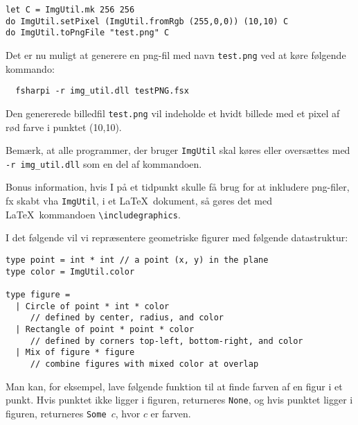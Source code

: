 \begin{lstlisting}[numbers=none,frame=none,mathescape]
let C = ImgUtil.mk 256 256
do ImgUtil.setPixel (ImgUtil.fromRgb (255,0,0)) (10,10) C
do ImgUtil.toPngFile "test.png" C
\end{lstlisting}

\noindent
Det er nu muligt at generere en png-fil med navn \texttt{test.png} ved
at køre følgende kommando:

\vspace{-4mm}
\begin{verbatim}
  fsharpi -r img_util.dll testPNG.fsx
\end{verbatim}
\vspace{-4mm}

\noindent
Den genererede billedfil \texttt{test.png} vil indeholde
et hvidt billede med et pixel af rød farve i punktet (10,10).

\noindent
Bemærk, at alle programmer, der bruger \texttt{ImgUtil} skal køres
eller oversættes med \texttt{-r img\_util.dll} som en del af
kommandoen.

\noindent
Bonus information, hvis I på et tidpunkt skulle få brug for at
inkludere png-filer, fx skabt vha \texttt{ImgUtil}, i et \LaTeX\
dokument, så gøres det med \LaTeX\ kommandoen \texttt{\textbackslash{}includegraphics}.

\vspace{2ex}

\noindent
I det følgende vil vi repræsentere geometriske figurer med følgende
datastruktur:

\begin{lstlisting}[numbers=none,frame=none,mathescape]
type point = int * int // a point (x, y) in the plane
type color = ImgUtil.color

type figure =
  | Circle of point * int * color
     // defined by center, radius, and color
  | Rectangle of point * point * color
     // defined by corners top-left, bottom-right, and color
  | Mix of figure * figure
     // combine figures with mixed color at overlap
\end{lstlisting}

\noindent
Man kan, for eksempel, lave følgende funktion til at finde farven af en
figur i et punkt.  Hvis punktet ikke ligger i figuren, returneres
\texttt{None}, og hvis punktet ligger i figuren, returneres
\texttt{Some $c$}, hvor $c$ er farven.

